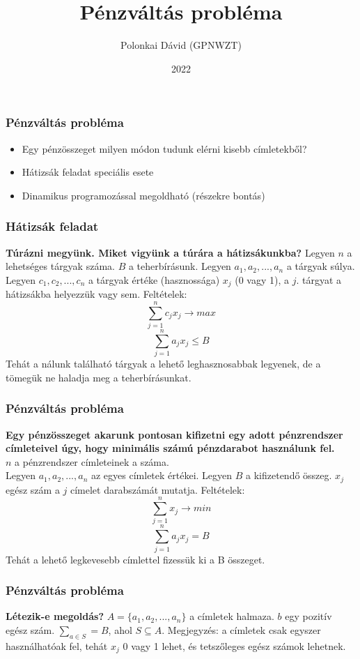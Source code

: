 \documentclass{beamer}
\title{Pénzváltás probléma}
\author{Polonkai Dávid (GPNWZT)}
\institute{Miskolci Egyetem}
\date{2022}
\begin{document}
\frame{\titlepage}

\begin{frame}
\frametitle{Pénzváltás probléma}
\begin{itemize}
    \item Egy pénzösszeget milyen módon tudunk elérni kisebb címletekből?
    \item Hátizsák feladat speciális esete
    \item Dinamikus programozással megoldható (részekre bontás)
\end{itemize}

\end{frame}
\begin{frame}
    \frametitle{Hátizsák feladat}
    \textbf{Túrázni megyünk. Miket vigyünk a túrára a hátizsákunkba?}
    Legyen \(n\) a lehetséges tárgyak száma. \newline
    \(B\) a teherbírásunk. \newline
    Legyen \(a_1,a_2,...,a_n\) a tárgyak súlya.\newline
    Legyen \(c_1,c_2,...,c_n\) a tárgyak értéke (hasznossága)\newline
    \(x_j\) (0 vagy 1), a \(j\). tárgyat a hátizsákba helyezzük vagy sem.\newline  
    Feltételek:  
    \[\sum_{j=1}^{n}c_j x_j \rightarrow max\]
    \[\sum_{j=1}^{n}a_j x_j \le B\]
    Tehát a nálunk található tárgyak a lehető leghasznosabbak legyenek, de a tömegük ne haladja meg a teherbírásunkat.
\end{frame}
\begin{frame}
    \frametitle{Pénzváltás probléma}
    \textbf{Egy pénzösszeget akarunk pontosan kifizetni egy adott pénzrendszer címleteivel úgy,
    hogy minimális számú pénzdarabot használunk fel.}\\
    \(n\) a pénzrendszer címleteinek a száma.\\
    Legyen \(a_1,a_2,...,a_n\) az egyes címletek értékei.\newline
    Legyen \(B\) a kifizetendő összeg.\newline
    \(x_j\) egész szám a \(j\) címelet darabszámát mutatja.\newline  
    Feltételek:  
    \[\sum_{j=1}^{n}x_j \rightarrow min\]
    \[\sum_{j=1}^{n}a_j x_j = B\]
    Tehát a lehető legkevesebb címlettel fizessük ki a B összeget.
\end{frame}
\begin{frame}
    \frametitle{Pénzváltás probléma}
    \textbf{Létezik-e megoldás?}  \newline
    \(A = \{a_1,a_2,...,a_n\}\) a címletek halmaza.\newline
    \(b\) egy pozitív egész szám.\newline
    \(\sum_{a \in S} = B\), ahol \(S \subseteq A\).\newline
    Megjegyzés: a címletek csak egyszer használhatóak fel, tehát \(x_j\) 0 vagy 1 lehet, és tetszőleges egész számok lehetnek.\newline
\end{frame}
\end{document}
